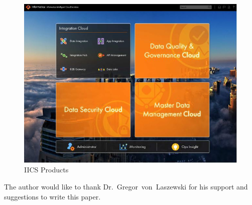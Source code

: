 \begin{figure}[!ht]
	\centering\includegraphics[width=\columnwidth]{images/IICS-0.jpg}
	\caption{IICS Products}\label{f:iics-products}
\end{figure}

\begin{acks}

The author would like to thank Dr.~Gregor~von~Laszewski for his
support and suggestions to write this paper.

\end{acks}


 
